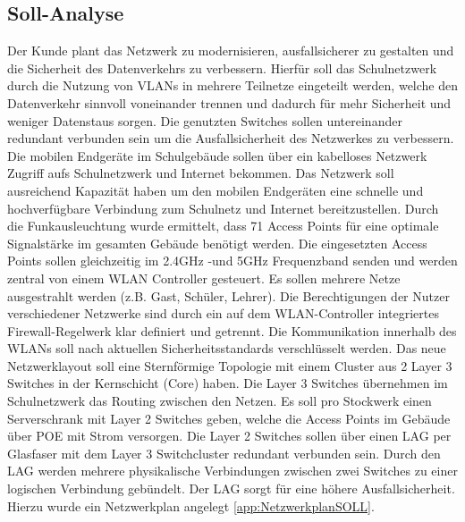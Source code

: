 \subsection{Soll-Analyse}
\label{sec:Soll-Analyse}
Der Kunde plant das Netzwerk zu modernisieren, ausfallsicherer zu gestalten und die Sicherheit des Datenverkehrs zu verbessern. Hierfür soll das Schulnetzwerk durch die Nutzung von \ac{VLAN}s in mehrere Teilnetze eingeteilt werden, welche den Datenverkehr sinnvoll voneinander trennen und dadurch für mehr Sicherheit und weniger Datenstaus sorgen. Die genutzten Switches sollen untereinander redundant verbunden sein um die Ausfallsicherheit des Netzwerkes zu verbessern. Die mobilen Endgeräte im Schulgebäude sollen über ein kabelloses Netzwerk Zugriff aufs Schulnetzwerk und Internet bekommen. Das Netzwerk soll ausreichend Kapazität haben um den mobilen Endgeräten eine schnelle und hochverfügbare Verbindung zum Schulnetz und Internet bereitzustellen. Durch die Funkausleuchtung wurde ermittelt, dass 71 Access Points für eine optimale Signalstärke im gesamten Gebäude benötigt werden.
Die eingesetzten Access Points sollen gleichzeitig im 2.4GHz -und 5GHz Frequenzband senden und werden zentral von einem WLAN Controller gesteuert.
Es sollen mehrere Netze ausgestrahlt werden (z.B. Gast, Schüler, Lehrer). 
Die Berechtigungen der Nutzer verschiedener Netzwerke sind durch ein auf dem WLAN-Controller integriertes Firewall-Regelwerk klar definiert und getrennt. 
Die Kommunikation innerhalb des WLANs soll nach aktuellen Sicherheitsstandards verschlüsselt werden. Das neue Netzwerklayout soll eine Sternförmige Topologie mit einem Cluster aus 2 Layer 3 Switches in der Kernschicht (Core) haben. Die Layer 3 Switches übernehmen im Schulnetzwerk das Routing zwischen den Netzen. Es soll pro Stockwerk einen Serverschrank mit Layer 2 Switches geben, welche die Access Points im Gebäude über \ac{POE} mit Strom versorgen. Die Layer 2 Switches sollen über einen \ac{LAG} per Glasfaser mit dem Layer 3 Switchcluster redundant verbunden sein. Durch den LAG werden mehrere physikalische Verbindungen zwischen zwei Switches zu einer logischen Verbindung gebündelt. Der LAG sorgt für eine höhere Ausfallsicherheit. Hierzu wurde ein Netzwerkplan angelegt \ref{app:NetzwerkplanSOLL}.

\begin{comment}
	\item Wie ist die bisherige Situation (\zB bestehende Programme, Wünsche der Mitarbeiter)?
	\item Was gilt es zu erstellen/verbessern?
\end{comment}
